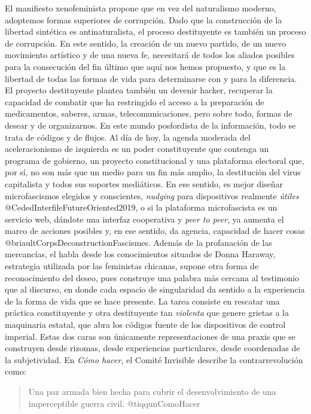 \documentclass[
]{article}
\begin{document}
El manifiesto xenofeminista propone que en vez del naturalismo moderno,
adoptemos formas superiores de corrupción. Dado que la construcción de
la libertad sintética es antinaturalista, el proceso destituyente es
también un proceso de corrupción. En este sentido, la creación de un
nuevo partido, de un nuevo movimiento artístico y de una nueva fe,
necesitará de todos los aliados posibles para la consecución del fin
último que aquí nos hemos propuesto, y que es la libertad de todas las
formas de vida para determinarse con y para la diferencia. El proyecto
destituyente plantea también un devenir hacker, recuperar la capacidad
de combatir que ha restringido el acceso a la preparación de
medicamentos, saberes, armas, telecomunicaciones, pero sobre todo,
formas de desear y de organizarnos. En este mundo posfordista de la
información, todo se trata de códigos y de flujos. Al día de hoy, la
agenda moderada del aceleracionismo de izquierda es un poder
constituyente que contenga un programa de gobierno, un proyecto
constitucional y una plataforma electoral que, por sí, no son más que un
medio para un fin más amplio, la destitución del virus capitalista y
todos sus soportes mediáticos. En ese sentido, es mejor diseñar
microfascismos elegidos y conscientes, \emph{nudging} para dispositivos
realmente \emph{útiles} @CededInterfileFutureOriented2019, o si la
plataforma microfascista es un servicio web, dándote una interfaz
cooperativa y \emph{peer to peer}, ya aumenta el marco de acciones
posibles y, en ese sentido, da agencia, capacidad de hacer cosas
@briaultCorpsDeconstructionFascismes. Además de la profanación de las
mercancías, el habla desde los conocimientos situados de Donna Haraway,
estrategia utilizada por las feministas chicanas, supone otra forma de
reconocimiento del deseo, pues construye una palabra más cercana al
testimonio que al discurso, en donde cada espacio de singularidad da
sentido a la experiencia de la forma de vida que se hace presente. La
tarea consiste en rescatar una práctica constituyente y otra
destituyente tan \emph{violenta} que genere grietas a la maquinaria
estatal, que abra los códigos fuente de los dispositivos de control
imperial. Estas dos caras son únicamente representaciones de una praxis
que se construyen desde rizomas, desde experiencias particulares, desde
coordenadas de la subjetividad. En \emph{Cómo hacer}, el Comité
Invisible describe la contrarrevolución como:

\begin{quote}
Una paz armada bien hecha para cubrir el desenvolvimiento de una
imperceptible guerra civil. @tiqqunComoHacer
\end{quote}
\end{document}
